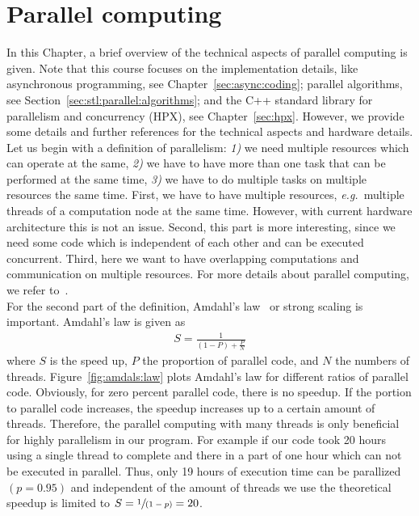 \chapter{Parallel computing}
In this Chapter, a brief overview of the technical aspects of parallel computing is given. Note that this course focuses on the implementation details, like asynchronous programming, see Chapter~\ref{sec:async:coding}; parallel algorithms, see Section~\ref{sec:stl:parallel:algorithms}; and the C++ standard library for parallelism and concurrency (HPX), see Chapter~\ref{sec:hpx}. However, we provide some details and further references for the technical aspects and hardware details.\\

Let us begin with a definition of parallelism: \textit{1)} we need multiple resources which can operate at the same, \textit{2)} we have to have more than one task that can be performed at the same time, \textit{3)} we have to do multiple tasks on multiple resources the same time. First, we have to have multiple resources, \emph{e.g.}\ multiple threads of a computation node at the same time. However, with current hardware architecture this is not an issue. Second, this part is more interesting, since we need some code which is independent of each other and can be executed concurrent. Third, here we want to have overlapping computations and communication on multiple resources. For more details about parallel computing, we refer to~\cite{grama2003introduction,trobec2018introduction}.\\

For the second part of the definition, Amdahl's law~\cite{amdahl1967validity} or strong scaling is important. Amdahl's law is given as
\begin{align}
S = \frac{1}{(1-P) + \frac{P}{N}}
\end{align}
where $S$ is the speed up, $P$ the proportion of parallel code, and $N$ the numbers of threads. Figure~\ref{fig:amdals:law} plots Amdahl's law for different ratios of parallel code. Obviously, for zero percent parallel code, there is no speedup. If the portion to parallel code increases, the speedup increases up to a certain amount of threads. Therefore, the parallel computing with many threads is only beneficial for highly parallelism in our program. For example if our code took 20 hours using a single thread to complete and there in a part of one hour which can not be executed in parallel. Thus, only 19 hours of execution time can be parallized $(p=0.95)$ and independent of the amount of threads we use the theoretical speedup is limited to $S=\sfrac{1}{(1-p)}=20$.\\

